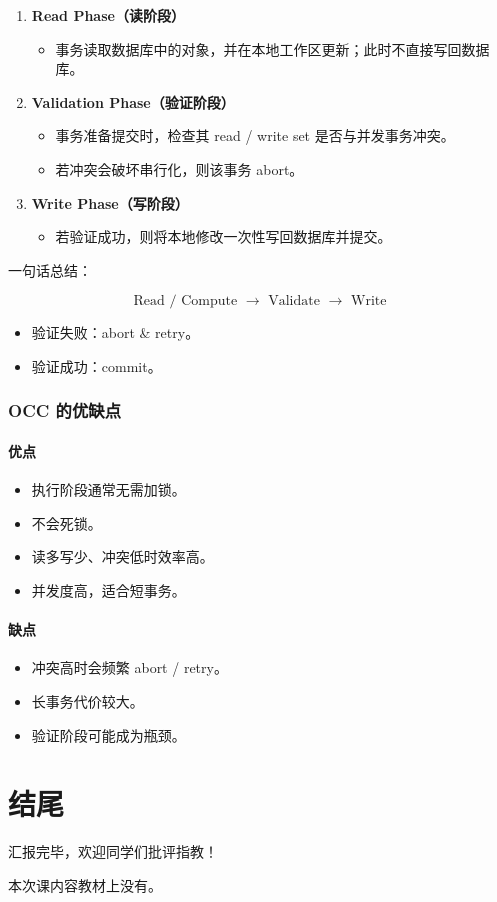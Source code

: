 \begin{enumerate}
  \item \textbf{Read Phase（读阶段）}
  \begin{itemize}
    \item 事务读取数据库中的对象，并在本地工作区更新；此时不直接写回数据库。
  \end{itemize}
  \item \textbf{Validation Phase（验证阶段）}
  \begin{itemize}
    \item 事务准备提交时，检查其 read / write set 是否与并发事务冲突。
    \item 若冲突会破坏串行化，则该事务 abort。
  \end{itemize}
  \item \textbf{Write Phase（写阶段）}
  \begin{itemize}
    \item 若验证成功，则将本地修改一次性写回数据库并提交。
  \end{itemize}
\end{enumerate}

一句话总结：

\[
\boxed{\text{Read / Compute } \rightarrow \text{ Validate } \rightarrow \text{ Write}}
\]

\begin{itemize}
  \item 验证失败：abort \& retry。
  \item 验证成功：commit。
\end{itemize}

\subsubsection{OCC 的优缺点}

\paragraph{优点}
\begin{itemize}
  \item 执行阶段通常无需加锁。
  \item 不会死锁。
  \item 读多写少、冲突低时效率高。
  \item 并发度高，适合短事务。
\end{itemize}

\paragraph{缺点}
\begin{itemize}
  \item 冲突高时会频繁 abort / retry。
  \item 长事务代价较大。
  \item 验证阶段可能成为瓶颈。
\end{itemize}

\section*{结尾}

汇报完毕，欢迎同学们批评指教！

本次课内容教材上没有。
